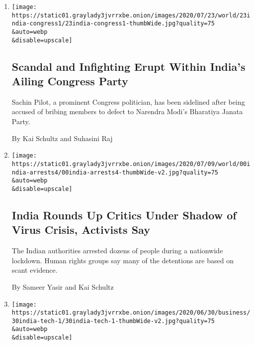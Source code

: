 \begin{enumerate}
\def\labelenumi{\arabic{enumi}.}
\item
  \href{/2020/07/23/world/asia/india-congress-sachin-pilot.html}{}

  \texttt{[image: https://static01.graylady3jvrrxbe.onion/images/2020/07/23/world/23india-congress1/23india-congress1-thumbWide.jpg?quality=75\\\&auto=webp\\\&disable=upscale]}

  \hypertarget{scandal-and-infighting-erupt-within-indias-ailing-congress-party}{%
  \subsection{Scandal and Infighting Erupt Within India's Ailing
  Congress
  Party}\label{scandal-and-infighting-erupt-within-indias-ailing-congress-party}}

  Sachin Pilot, a prominent Congress politician, has been sidelined
  after being accused of bribing members to defect to Narendra Modi's
  Bharatiya Janata Party.

  By Kai Schultz and Suhasini Raj
\item
  \href{/2020/07/19/world/asia/india-activists-arrests-riots-coronavirus.html}{}

  \texttt{[image: https://static01.graylady3jvrrxbe.onion/images/2020/07/09/world/00india-arrests4/00india-arrests4-thumbWide-v2.jpg?quality=75\\\&auto=webp\\\&disable=upscale]}

  \hypertarget{india-rounds-up-critics-under-shadow-of-virus-crisis-activists-say}{%
  \subsection{India Rounds Up Critics Under Shadow of Virus Crisis,
  Activists
  Say}\label{india-rounds-up-critics-under-shadow-of-virus-crisis-activists-say}}

  The Indian authorities arrested dozens of people during a nationwide
  lockdown. Human rights groups say many of the detentions are based on
  scant evidence.

  By Sameer Yasir and Kai Schultz
\item
  \href{/2020/06/30/technology/india-china-tiktok.html}{}

  \texttt{[image: https://static01.graylady3jvrrxbe.onion/images/2020/06/30/business/30india-tech-1/30india-tech-1-thumbWide-v2.jpg?quality=75\\\&auto=webp\\\&disable=upscale]}

  \hypertarget{with-indias-tiktok-ban-the-worlds-digital-walls-grow-higher}{%
}
\end{enumerate}
